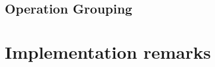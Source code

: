 \subsection{Operation Grouping}\label{grouping}
 




\section{Implementation remarks}\label{summary-implementation}

